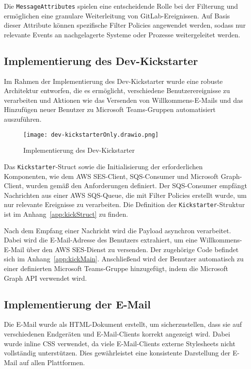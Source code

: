 Die \texttt{MessageAttributes} spielen eine entscheidende Rolle bei der Filterung und ermöglichen eine granulare Weiterleitung von GitLab-Ereignissen. Auf Basis dieser Attribute können spezifische Filter Policies angewendet werden, sodass nur relevante Events an nachgelagerte Systeme oder Prozesse weitergeleitet werden.



\subsection{Implementierung des Dev-Kickstarter}
\label{sec:ImplementierungBenutzeroberflaeche}

Im Rahmen der Implementierung des Dev-Kickstarter wurde eine robuste Architektur entworfen, die es ermöglicht, verschiedene Benutzerereignisse zu verarbeiten und Aktionen wie das Versenden von Willkommens-E-Mails und das Hinzufügen neuer Benutzer zu Microsoft Teams-Gruppen automatisiert auszuführen.

\begin{figure}[htb]
    \centering
    \texttt{[image: dev-kickstarterOnly.drawio.png]}
    \caption{Implementierung des Dev-Kickstarter}
\end{figure}

Das \texttt{Kickstarter}-Struct sowie die Initialisierung der erforderlichen Komponenten, wie dem AWS SES-Client, SQS-Consumer und Microsoft Graph-Client, wurden gemäß den Anforderungen definiert. Der SQS-Consumer empfängt Nachrichten aus einer AWS SQS-Queue, die mit Filter Policies erstellt wurde, um nur relevante Ereignisse zu verarbeiten. Die Definition der \texttt{Kickstarter}-Struktur ist im Anhang~\ref{app:kickStruct} zu finden.

Nach dem Empfang einer Nachricht wird die Payload asynchron verarbeitet. Dabei wird die E-Mail-Adresse des Benutzers extrahiert, um eine Willkommens-E-Mail über den AWS SES-Dienst zu versenden. Der zugehörige Code befindet sich im Anhang~\ref{app:kickMain}. Anschließend wird der Benutzer automatisch zu einer definierten Microsoft Teams-Gruppe hinzugefügt, indem die Microsoft Graph API verwendet wird.


\subsection{Implementierung der E-Mail}
\label{sec:ImplementierungGeschaeftslogik}

Die E-Mail wurde als HTML-Dokument erstellt, um sicherzustellen, dass sie auf verschiedenen Endgeräten und E-Mail-Clients korrekt angezeigt wird. Dabei wurde inline CSS verwendet, da viele E-Mail-Clients externe Stylesheets nicht vollständig unterstützen. Dies gewährleistet eine konsistente Darstellung der E-Mail auf allen Plattformen.

